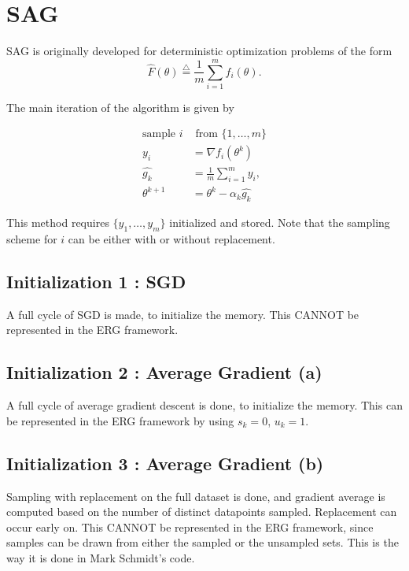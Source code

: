 \documentclass[12pt]{article}
\newcommand{\defeq}{\stackrel{\triangle}{=}}
\begin{document}
	\tableofcontents
	
	\section{SAG}
	SAG is originally developed for deterministic optimization problems of the form 
	\begin{equation}
		\label{saa}
 		\hat{F}(\theta) \defeq \frac{1}{m} \sum_{i=1}^{m}  f_i(\theta).
	\end{equation}
	
	The main iteration of the algorithm is given by 

 \begin{align*}
   \mbox{sample } i& \mbox{ from } \{1,\ldots,m\}  \\
   y_i &= \nabla f_i(\theta^k) \\
   \hat{g_k} &= \frac{1}{m} \sum_{i=1}^m y_i , \\ 
   \theta^{k+1} &= \theta^k - \alpha_k \hat{g_k}
 \end{align*}
 
 	This method requires $\{y_1,\ldots,y_m\}$ initialized and stored. Note that the sampling scheme for $i$ can be either with or without replacement. 
 
  \subsection{Initialization 1 : SGD}
  
  A full cycle of SGD is made, to initialize the memory. This CANNOT be represented in the ERG framework.
  
  \subsection{Initialization 2 : Average Gradient (a)}
  
  A full cycle of average gradient descent is done, to initialize the memory. This can be represented in the ERG framework by using $s_k=0$, $u_k=1$.
  
  \subsection{Initialization 3 : Average Gradient (b)}
  
  Sampling with replacement on the full dataset is done, and gradient average is computed based on the number of distinct datapoints sampled. Replacement can occur early on. This CANNOT be represented in the ERG framework, since samples can be drawn from either the sampled or the unsampled sets. This is the way it is done in Mark Schmidt's code. 
  
\end{document}
